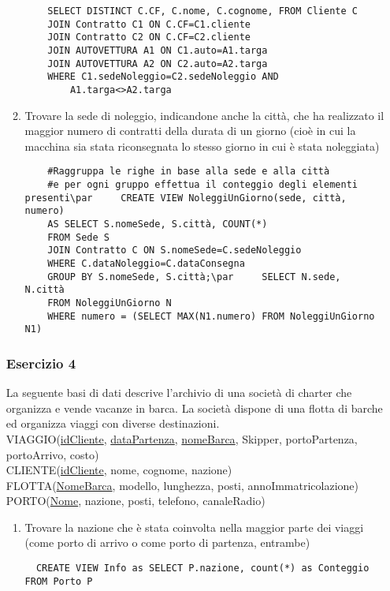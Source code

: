 \documentclass[a4paper]{article}
\begin{document}
\begin{enumerate}
\begin{enumerate}
\begin{verbatim}
    SELECT DISTINCT C.CF, C.nome, C.cognome, FROM Cliente C
    JOIN Contratto C1 ON C.CF=C1.cliente
    JOIN Contratto C2 ON C.CF=C2.cliente
    JOIN AUTOVETTURA A1 ON C1.auto=A1.targa
    JOIN AUTOVETTURA A2 ON C2.auto=A2.targa
    WHERE C1.sedeNoleggio=C2.sedeNoleggio AND
        A1.targa<>A2.targa
  \end{verbatim}
  \item Trovare la sede di noleggio, indicandone anche la città, che ha realizzato il maggior numero di contratti della durata di un giorno (cioè in cui la macchina sia stata riconsegnata lo stesso giorno in cui è stata noleggiata)
  \begin{verbatim}
    #Raggruppa le righe in base alla sede e alla città
    #e per ogni gruppo effettua il conteggio degli elementi presenti\par     CREATE VIEW NoleggiUnGiorno(sede, città, numero)
    AS SELECT S.nomeSede, S.città, COUNT(*)
    FROM Sede S
    JOIN Contratto C ON S.nomeSede=C.sedeNoleggio
    WHERE C.dataNoleggio=C.dataConsegna
    GROUP BY S.nomeSede, S.città;\par     SELECT N.sede, N.città
    FROM NoleggiUnGiorno N
    WHERE numero = (SELECT MAX(N1.numero) FROM NoleggiUnGiorno N1)
  \end{verbatim}
\end{enumerate}\par \subsubsection{Esercizio 4}
La seguente basi di dati descrive l'archivio di una società di charter che organizza e vende vacanze in barca. La società dispone di una flotta di barche ed organizza viaggi con diverse destinazioni.\medskip\\
VIAGGIO(\underline{idCliente}, \underline{dataPartenza}, \underline{nomeBarca}, Skipper, portoPartenza, portoArrivo, costo)\\
CLIENTE(\underline{idCliente}, nome, cognome, nazione)\\
FLOTTA(\underline{NomeBarca}, modello, lunghezza, posti, annoImmatricolazione)\\
PORTO(\underline{Nome}, nazione, posti, telefono, canaleRadio)
\begin{enumerate}
\item Trovare la nazione che è stata coinvolta nella maggior parte dei viaggi (come porto di arrivo o come porto di partenza, entrambe)
  \begin{verbatim}
  CREATE VIEW Info as SELECT P.nazione, count(*) as Conteggio FROM Porto P

\end{verbatim}
\end{enumerate}
\end{enumerate}
\end{document}
